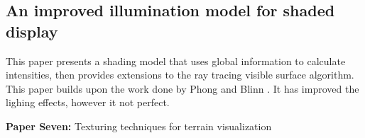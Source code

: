 \documentclass{scrartcl}
\begin{document}
\subsection{An improved illumination model for shaded display \cite{whitted2005improved}}

This paper presents a shading model that uses global information to calculate intensities, then provides extensions to the ray tracing visible surface algorithm. 
This paper builds upon the work done by Phong \cite{phong1975illumination} and Blinn \cite{Blinn1977}. It has improved the lighing effects, however it not perfect.





\par

\textbf{Paper Seven:}
Texturing techniques for terrain visualization
\cite{dollner2000texturing}
\par


\par




\end{document}
